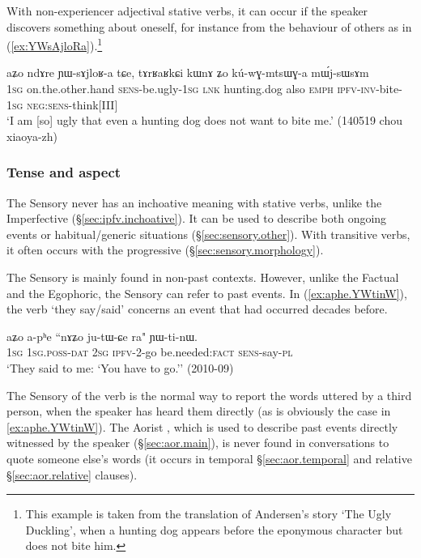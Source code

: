 With non-experiencer adjectival stative verbs, it can occur if the speaker discovers something about oneself, for instance from the behaviour of others as in (\ref{ex:YWsAjloRa}).\footnote{This example is taken from the translation of Andersen's story `The Ugly Duckling', when a hunting dog appears before the eponymous character but does not bite him. }

\begin{exe}
\ex \label{ex:YWsAjloRa}
\gll  aʑo ndɤre ɲɯ-sɤjloʁ-a tɕe, tɤrʁaʁkɕi kɯnɤ ʑo kú-wɣ-mtsɯɣ-a mɯ́j-sɯsɤm \\
\textsc{1sg} on.the.other.hand \textsc{sens}-be.ugly-\textsc{1sg} \textsc{lnk} hunting.dog also \textsc{emph} \textsc{ipfv}-\textsc{inv}-bite-\textsc{1sg} \textsc{neg}:\textsc{sens}-think[III] \\
\glt `I am [so] ugly that even a hunting dog does not want to bite me.'  (140519 chou xiaoya-zh)
\end{exe}

 
\subsubsection{Tense and aspect} \label{sec:sensory.functions}
The Sensory never has an inchoative meaning with stative verbs, unlike the Imperfective (§\ref{sec:ipfv.inchoative}). It can be used to describe both ongoing events or habitual/generic situations (§\ref{sec:sensory.other}).
With transitive verbs, it often occurs with the progressive (§\ref{sec:sensory.morphology}). 

The Sensory is mainly found in non-past contexts. However, unlike the Factual and the Egophoric, the Sensory can refer to past events. In (\ref{ex:aphe.YWtinW}), the verb  `they say/said' concerns an event that had occurred decades before.

\begin{exe}
\ex \label{ex:aphe.YWtinW}
\gll  aʑo a-pʰe ``nɤʑo ju-tɯ-ɕe ra" ɲɯ-ti-nɯ. \\
\textsc{1sg} \textsc{1sg}.\textsc{poss}-\textsc{dat} \textsc{2sg} \textsc{ipfv}-2-go be.needed:\textsc{fact} \textsc{sens}-say-\textsc{pl} \\
\glt  `They said to me: `You have to go.'' (2010-09)
\end{exe}

The Sensory  of the verb  is the normal way to report the words uttered by a third person, when the speaker has heard them directly (as is obviously the case in \ref{ex:aphe.YWtinW}). The Aorist , which is used to describe past events directly witnessed by the speaker (§\ref{sec:aor.main}), is never found in conversations to quote someone else's words (it occurs in temporal §\ref{sec:aor.temporal} and relative §\ref{sec:aor.relative} clauses).

